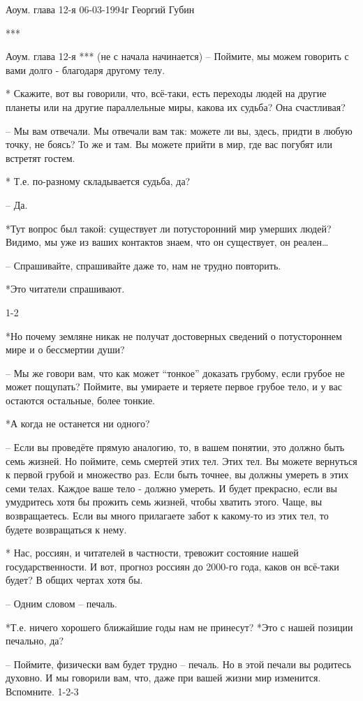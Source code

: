 Аоум. глава 12-я 06-03-1994г
Георгий Губин
  
***
 
Аоум. глава 12-я
***
 (не с начала начинается)
 – Поймите, мы можем говорить с вами долго - благодаря другому телу.

 * Скажите, вот вы говорили, что, всё-таки, есть переходы людей на другие планеты или на другие параллельные миры, какова их судьба? Она счастливая?

 – Мы вам отвечали. Мы отвечали вам так: можете ли вы, здесь, придти в любую точку, не боясь? То же и там. Вы можете прийти в мир, где вас погубят или встретят гостем.

 * Т.е. по-разному складывается судьба, да?

 – Да.

 *Тут вопрос был такой: существует ли потусторонний мир умерших людей? Видимо, мы уже из ваших контактов знаем, что он существует, он реален…

 – Спрашивайте, спрашивайте даже то, нам не трудно повторить.

 *Это читатели спрашивают.

 1-2

 *Но почему земляне никак не получат достоверных сведений о потустороннем мире и о бессмертии души?

  – Мы же говори вам, что как может “тонкое” доказать грубому, если грубое не может пощупать? Поймите, вы умираете и теряете первое грубое тело, и у вас остаются остальные, более тонкие.

 *А когда не останется ни одного?

 – Если вы проведёте прямую аналогию, то, в вашем понятии, это должно быть семь жизней. Но поймите, семь смертей этих тел. Этих тел. Вы можете вернуться к первой грубой и множество раз. Если быть точнее, вы должны умереть в этих семи телах. Каждое ваше тело - должно умереть. И будет прекрасно, если вы умудритесь хотя бы прожить семь жизней, чтобы хватить этого. Чаще, вы возвращаетесь. Если вы много прилагаете забот к какому-то из этих тел, то будете возвращаться к нему.

 * Нас, россиян, и читателей в частности, тревожит состояние нашей государственности. И вот, прогноз россиян до 2000-го года, каков он всё-таки будет? В общих чертах хотя бы.

 – Одним словом – печаль.

 *Т.е. ничего хорошего ближайшие годы нам не принесут?
 *Это с нашей позиции печально, да?

 – Поймите, физически вам будет трудно – печаль. Но в этой печали вы родитесь духовно. И мы говорили вам, что, даже при вашей жизни мир изменится. Вспомните.
 1-2-3

